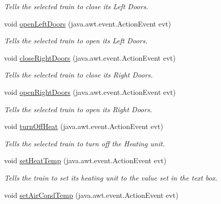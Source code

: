 \begin{DoxyCompactItemize}
\begin{DoxyCompactList}\small\item\em Tells the selected train to close its Left Doors. \end{DoxyCompactList}\item 
void \hyperlink{classTrainControllerComps_1_1TCUtilityPanel_ab9991ca4e0a03b9e7a1b8e4fc130a4c7}{open\+Left\+Doors} (java.\+awt.\+event.\+Action\+Event evt)
\begin{DoxyCompactList}\small\item\em Tells the selected train to open its Left Doors. \end{DoxyCompactList}\item 
void \hyperlink{classTrainControllerComps_1_1TCUtilityPanel_a11c919b1746a816666bf4b9f6b03c198}{close\+Right\+Doors} (java.\+awt.\+event.\+Action\+Event evt)
\begin{DoxyCompactList}\small\item\em Tells the selected train to close its Right Doors. \end{DoxyCompactList}\item 
void \hyperlink{classTrainControllerComps_1_1TCUtilityPanel_a2c749a54d70852921749ad2821a0de91}{open\+Right\+Doors} (java.\+awt.\+event.\+Action\+Event evt)
\begin{DoxyCompactList}\small\item\em Tells the selected train to open its Right Doors. \end{DoxyCompactList}\item 
void \hyperlink{classTrainControllerComps_1_1TCUtilityPanel_a1ff45743a540a22a35ae747e4078984e}{turn\+Off\+Heat} (java.\+awt.\+event.\+Action\+Event evt)
\begin{DoxyCompactList}\small\item\em Tells the selected train to turn off the Heating unit. \end{DoxyCompactList}\item 
void \hyperlink{classTrainControllerComps_1_1TCUtilityPanel_a0123532c001a7bedfc7b4f54dbf26e5e}{set\+Heat\+Temp} (java.\+awt.\+event.\+Action\+Event evt)
\begin{DoxyCompactList}\small\item\em Tells the train to set its heating unit to the value set in the text box. \end{DoxyCompactList}\item 
void \hyperlink{classTrainControllerComps_1_1TCUtilityPanel_ac0b4656718e1a3b6d9a794b89ce5046c}{set\+Air\+Cond\+Temp} (java.\+awt.\+event.\+Action\+Event evt)

\end{DoxyCompactItemize}
